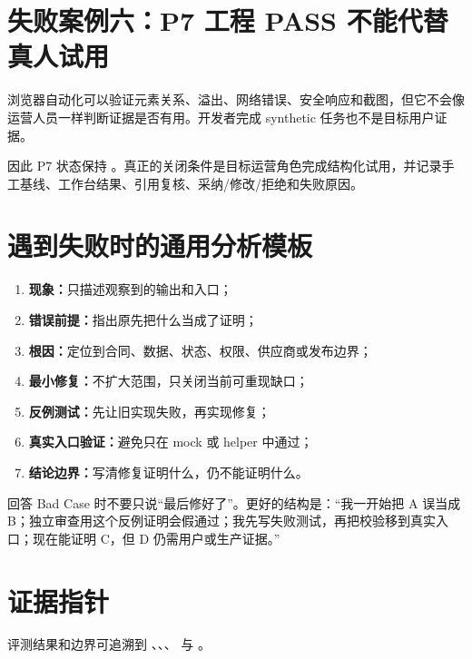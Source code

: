 \section{失败案例六：P7 工程 PASS 不能代替真人试用}

浏览器自动化可以验证元素关系、溢出、网络错误、安全响应和截图，但它不会像运营人员一样判断证据是否有用。开发者完成 synthetic 任务也不是目标用户证据。

因此 P7 状态保持 \statusprogress。真正的关闭条件是目标运营角色完成结构化试用，并记录手工基线、工作台结果、引用复核、采纳/修改/拒绝和失败原因。

\section{遇到失败时的通用分析模板}

\begin{enumerate}
  \item \textbf{现象：}只描述观察到的输出和入口；
  \item \textbf{错误前提：}指出原先把什么当成了证明；
  \item \textbf{根因：}定位到合同、数据、状态、权限、供应商或发布边界；
  \item \textbf{最小修复：}不扩大范围，只关闭当前可重现缺口；
  \item \textbf{反例测试：}先让旧实现失败，再实现修复；
  \item \textbf{真实入口验证：}避免只在 mock 或 helper 中通过；
  \item \textbf{结论边界：}写清修复证明什么，仍不能证明什么。
\end{enumerate}

\begin{interviewbox}
回答 Bad Case 时不要只说“最后修好了”。更好的结构是：“我一开始把 A 误当成 B；独立审查用这个反例证明会假通过；我先写失败测试，再把校验移到真实入口；现在能证明 C，但 D 仍需用户或生产证据。”
\end{interviewbox}

\section{证据指针}

评测结果和边界可追溯到 、、、 与 。
